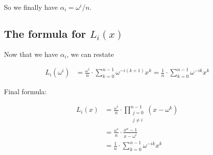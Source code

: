 \documentclass[a4paper]{article}
\begin{document}
So we finally have $\alpha_i = \omega^i / n$.



\subsection{The formula for $L_i(x)$}

Now that we have $\alpha_i$, we can restate 

\begin{equation}
  \begin{aligned}
    L_i(\omega^i) &= \frac{\omega^i}{n} \cdot \sum_{k=0}^{n-1} \omega^{-i(k+1)} x^k = \frac{1}{n} \cdot \sum_{k=0}^{n-1} \omega^{-ik} x^k
  \end{aligned}
\end{equation}

Final formula:

\begin{equation}
  \begin{aligned}
    L_i(x) &= \frac{\omega^i}{n} \cdot \prod_{\substack{j=0 \\ j \neq i}}^{n-1} (x - \omega^k) \\
           &= \frac{\omega^i}{n} \cdot \frac{x^n - 1}{x - \omega^i} \\
           &= \frac{1}{n} \cdot \sum_{k=0}^{n-1} \omega^{-ik} x^k
  \end{aligned}
\end{equation}



%
%



\end{document}
